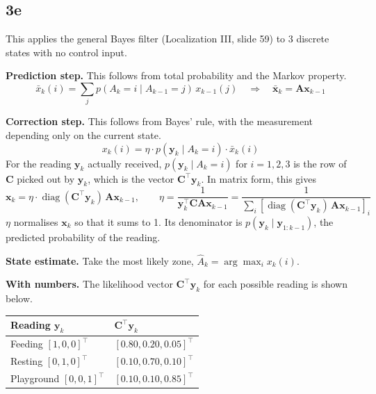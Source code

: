 \documentclass[11pt]{article}
\newcommand{\vect}[1]{\mathbf{#1}}
\newcommand{\mat}[1]{\mathbf{#1}}
\begin{document}
\subsection*{3e}

This applies the general Bayes filter (Localization III, slide 59) to 3 discrete states with no control input.

\textbf{Prediction step.} This follows from total probability and the Markov property.
\begin{equation*}
    \bar{x}_k(i) = \sum_j p(A_k = i \mid A_{k-1} = j)\, x_{k-1}(j) \quad\Longrightarrow\quad \bar{\vect{x}}_k = \mat{A}\vect{x}_{k-1}
\end{equation*}

\textbf{Correction step.} This follows from Bayes' rule, with the measurement depending only on the current state.
\begin{equation*}
    x_k(i) = \eta \cdot p(\vect{y}_k \mid A_k = i) \cdot \bar{x}_k(i)
\end{equation*}
For the reading $\vect{y}_k$ actually received, $p(\vect{y}_k \mid A_k = i)$ for $i = 1, 2, 3$ is the row of $\mat{C}$ picked out by $\vect{y}_k$, which is the vector $\mat{C}^\top\vect{y}_k$. In matrix form, this gives
\begin{equation*}
    \vect{x}_k = \eta \cdot \operatorname{diag}(\mat{C}^\top\vect{y}_k)\, \mat{A}\vect{x}_{k-1}, \qquad \eta = \frac{1}{\vect{y}_k^\top\mat{C}\mat{A}\vect{x}_{k-1}} = \frac{1}{\sum_i [\operatorname{diag}(\mat{C}^\top\vect{y}_k)\,\mat{A}\vect{x}_{k-1}]_i}
\end{equation*}
$\eta$ normalises $\vect{x}_k$ so that it sums to 1. Its denominator is $p(\vect{y}_k \mid \vect{y}_{1:k-1})$, the predicted probability of the reading.

\textbf{State estimate.} Take the most likely zone, $\hat{A}_k = \arg\max_i x_k(i)$.

\textbf{With numbers.} The likelihood vector $\mat{C}^\top\vect{y}_k$ for each possible reading is shown below.
\begin{center}
\begin{tabular}{ll}
    \toprule
    Reading $\vect{y}_k$ & $\mat{C}^\top\vect{y}_k$ \\
    \midrule
    Feeding $[1, 0, 0]^\top$ & $[0.80, 0.20, 0.05]^\top$ \\
    Resting $[0, 1, 0]^\top$ & $[0.10, 0.70, 0.10]^\top$ \\
    Playground $[0, 0, 1]^\top$ & $[0.10, 0.10, 0.85]^\top$ \\
    \bottomrule
\end{tabular}
\end{center}
\end{document}
